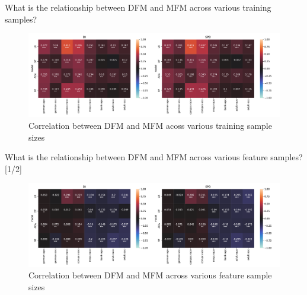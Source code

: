 \documentclass[aspectratio=169]{beamer}
\begin{document}
\begin{frame}{What is the relationship between DFM and MFM across
  various training samples?}
  \begin{figure}
    \centering
    \includegraphics[width=0.95\linewidth]{heatmap--corr--frac.pdf}
    \caption{Correlation between DFM and MFM acoss various training
      sample sizes}
    \label{fig:heatmap--corr--frac}
  \end{figure}
\end{frame}

\begin{frame}{What is the relationship between DFM and MFM across
  various feature samples? [1/2]}
  \begin{figure}
    \centering
    \includegraphics[width=0.95\linewidth]{heatmap--corr--num-features.pdf}
    \caption{Correlation between DFM and MFM across various feature
      sample sizes}
    \label{fig:heatmap--corr--num-features}
  \end{figure}
\end{frame}
\end{document}
